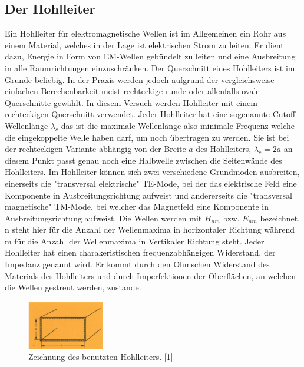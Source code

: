 \subsection{Der Hohlleiter}
\label{sec:thwellenleiter}
Ein Hohlleiter für elektromagnetische Wellen ist im Allgemeinen ein Rohr aus einem Material, welches in der 
Lage ist elektrischen Strom zu leiten. Er dient dazu, Energie in Form von EM-Wellen gebündelt zu leiten und
eine Ausbreitung in alle Raumrichtungen einzuschränken. Der Querschnitt eines Hohlleiters ist im Grunde 
beliebig. In der Praxis werden jedoch aufgrund der vergleichsweise einfachen Berechenbarkeit meist rechteckige
runde oder allenfalls ovale Querschnitte gewählt. In diesem Versuch werden Hohlleiter mit einem rechteckigen
Querschnitt verwendet. Jeder Hohlleiter hat eine sogenannte Cutoff Wellenlänge $\lambda_c$ das ist die maximale
Wellenlänge also minimale Frequenz welche die eingekoppelte Welle haben darf, um noch übertragen zu werden.
Sie ist bei der rechteckigen Variante abhängig von der Breite $a$ des Hohlleiters, $\lambda_c=2a$ an diesem Punkt
passt genau noch eine Halbwelle zwischen die Seitenwände des Hohlleiters. Im Hohlleiter können sich zwei verschiedene
Grundmoden ausbreiten, einerseits die "transversal elektrische" TE-Mode, bei der das elektrische Feld eine Komponente
in Ausbreitungsrichtung aufweist und andererseits die "transversal magnetische" TM-Mode, bei welcher das Magnetfeld
eine Komponente in Ausbreitungsrichtung aufweist. Die Wellen werden mit $H_{nm}$ bzw. $E_{nm}$
bezeichnet. n steht hier für die Anzahl der Wellenmaxima in horizontaler Richtung während m für die Anzahl der 
Wellenmaxima in Vertikaler Richtung steht. Jeder Hohlleiter hat einen charakeristischen frequenzabhängigen
Widerstand, der Impedanz genannt wird. Er kommt durch den Ohmschen Widerstand des Materials des Hohlleiters
und durch Imperfektionen der Oberflächen, an welchen die Wellen gestreut werden, zustande.

\begin{figure}
    \centering
    \includegraphics[width=0.3\textwidth,angle=0]{content/grafiken/Hohlleiter.PNG}
    \caption{Zeichnung des benutzten Hohlleiters. [1]}
    \label{fig:Hohlleiter}
  \end{figure}

